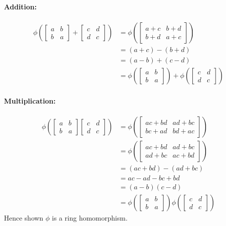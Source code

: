 \documentclass[12pt]{article}
\begin{document}
\begin{enumerate}
\begin{enumerate}
				\paragraph{Addition:}
					\begin{align*}
						\phi\left(\begin{bmatrix} a & b\\ b & a \end{bmatrix}
						+ \begin{bmatrix} c & d\\ d & c \end{bmatrix}\right) &=
							\phi\left(\begin{bmatrix} a+c & b+d\\ b+d & a+c
							\end{bmatrix}\right)\\
							&= (a+c) - (b+d)\\
							&= (a-b) + (c-d)\\
							&= \phi\left(\begin{bmatrix} a & b\\ b & a \end{bmatrix}\right)
							+ \phi\left(\begin{bmatrix} c & d\\ d & c \end{bmatrix}\right)
					\end{align*}

				\paragraph{Multiplication:}
					\begin{align*}
						\phi\left(\begin{bmatrix} a & b\\ b & a \end{bmatrix}
						\begin{bmatrix} c & d\\ d & c \end{bmatrix}\right) &=
							\phi\left(\begin{bmatrix} ac+bd & ad+bc\\ bc+ad & bd+ac
							\end{bmatrix}\right)\\
						&=\phi\left(\begin{bmatrix} ac+bd & ad+bc\\ ad+bc& ac+bd
							\end{bmatrix}\right)\\
						&=(ac+bd)-(ad+bc)\\
						&=ac-ad-bc+bd\\
						&=(a-b)(c-d)\\
						&=\phi\left(\begin{bmatrix} a & b\\ b & a \end{bmatrix}\right)
						\phi\left(\begin{bmatrix} c & d\\ d & c \end{bmatrix}\right)
					\end{align*}
					Hence shown $\phi$ is a ring homomorphism.


\end{enumerate}
\end{enumerate}
\end{document}
